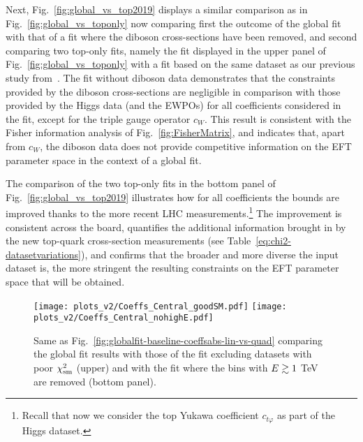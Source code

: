 Next, Fig.~\ref{fig:global_vs_top2019} displays a
similar comparison as in Fig.~\ref{fig:global_vs_toponly}
now comparing first the outcome of the global fit with that of a fit
where the diboson cross-sections have been removed,
and second comparing two top-only fits, namely the fit displayed
in the upper panel of Fig.~\ref{fig:global_vs_toponly} with  a
fit based on the same dataset as our previous study from~\cite{Hartland:2019bjb}.
%
The fit without diboson data demonstrates that the constraints provided by the diboson
cross-sections are negligible in comparison with those provided by the Higgs data
(and the EWPOs) for all coefficients considered in the fit, except for the triple
gauge operator $c_{W}$.
%
This result is consistent with the Fisher information
analysis of Fig.~\ref{fig:FisherMatrix}, and indicates that, apart from $c_W$, the diboson
data does not provide competitive information on the EFT parameter space in the context
of a global fit.

The comparison of the two top-only fits in the bottom
panel of Fig.~\ref{fig:global_vs_top2019} illustrates how for all coefficients
the bounds  are improved thanks to the more recent LHC measurements.\footnote{Recall that now we consider
  the top Yukawa coefficient $c_{t\varphi}$ as part of the Higgs dataset.}
%
The improvement is consistent across the board, quantifies the additional information
brought in by the new top-quark cross-section measurements
(see Table~\ref{eq:chi2-datasetvariations}),
and confirms that the broader and more diverse the input dataset is,
 the more stringent the resulting constraints
on the EFT parameter space that will be obtained.

\begin{figure}[t]
  \begin{center}
    \texttt{[image: plots\_v2/Coeffs\_Central\_goodSM.pdf]}
   \texttt{[image: plots\_v2/Coeffs\_Central\_nohighE.pdf]}
   \caption{\label{fig:global_vs_gooddata} \small
     Same as  Fig.~\ref{fig:globalfit-baseline-coeffsabs-lin-vs-quad}
     comparing the global fit results with those of the fit excluding datasets with poor $\chi^2_{\rm sm}$
   (upper) and with the fit where the bins with $E\gtrsim 1$ TeV are removed (bottom panel).}
  \end{center}
\end{figure}

